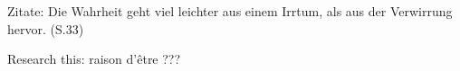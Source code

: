 Zitate:
Die Wahrheit geht viel leichter aus einem Irrtum, als aus der Verwirrung hervor.
(S.33)







Research this:
raison d'être ???